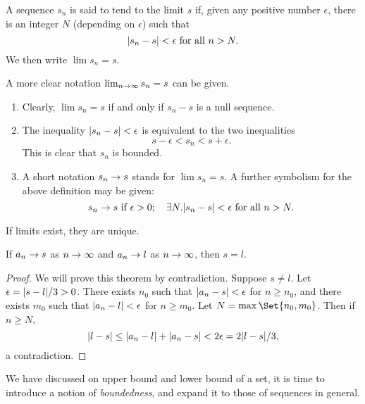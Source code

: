 \documentclass[main.tex]{subfiles}
\begin{document}
	\begin{definition}
		A sequence $s_n$ is said to tend to the limit $s$ if, given any positive number $\epsilon$, there is an integer $N$ (depending on $\epsilon$) such that
		\begin{equation*}
		\abs*{s_n - s} < \epsilon \text{ for all } n > N.
		\end{equation*}
		We then write $\lim s_n = s$.
	\end{definition}
	A more clear notation $\lim_{n \ra \infty} s_n = s$ can be given.
	\begin{note}
		\begin{enumerate}
			\item Clearly, $\lim s_n = s$ if and only if $s_n - s$ is a null sequence.
			
			\item The inequality $\abs*{s_n - s} < \epsilon$ is equivalent to the two inequalities
			\begin{equation*}
			s - \epsilon < s_n < s + \epsilon.
			\end{equation*}
			This is clear that $s_n$ is bounded.
			
			\item A short notation $s_n \ra s$ stands for $\lim s_n = s$. A further symbolism for the above definition may be given:
			\begin{equation*}
			s_n \ra s \text{ if } \epsilon >0;\quad \exists N.\abs*{s_n - s} < \epsilon \text{ for all } n > N.
			\end{equation*}
		\end{enumerate}
	\end{note}
	If limits exist, they are unique.
	\begin{theorem}
		If $a_n \ra s$ as $n \ra \infty$ and $a_n \ra l$ as $n \ra \infty$, then $s = l$.
	\end{theorem}
	\begin{proof}
		We will prove this theorem by contradiction. Suppose $s \neq l$. Let $\epsilon = \abs{s - l}/3 > 0$. There exists $n_0$ such that $\abs{a_n - s} < \epsilon$ for $n \geq n_0$, and there exists $m_0$ such that $\abs{a_n - l} < \epsilon$ for $n \geq m_0$. Let $N = \max\Set{n_0 , m_0}$. Then if $n \geq N$,
		\begin{equation*}
		\abs{l - s} \leq \abs{a_n - l} + \abs{a_n - s} < 2\epsilon = 2\abs{l - s}/3,
		\end{equation*}
		a contradiction.
	\end{proof}
	We have discussed on upper bound and lower bound of a set, it is time to introduce a notion of \textit{boundedness}, and expand it to those of sequences in general.
\end{document}
